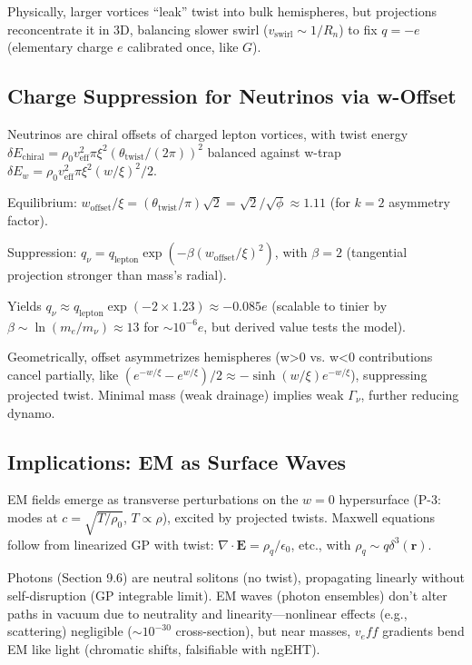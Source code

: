 \documentclass{article}
\begin{document}
Physically, larger vortices ``leak'' twist into bulk hemispheres, but projections reconcentrate it in 3D, balancing slower swirl ($v_{\text{swirl}} \sim 1/R_n$) to fix $q = -e$ (elementary charge $e$ calibrated once, like $G$).

\subsection{Charge Suppression for Neutrinos via w-Offset}

Neutrinos are chiral offsets of charged lepton vortices, with twist energy $\delta E_{\text{chiral}} = \rho_0 v_{\text{eff}}^2 \pi \xi^2 (\theta_{\text{twist}} / (2\pi))^2$ balanced against w-trap $\delta E_w = \rho_0 v_{\text{eff}}^2 \pi \xi^2 (w / \xi)^2 / 2$.

Equilibrium: $w_{\text{offset}} / \xi = (\theta_{\text{twist}} / \pi) \sqrt{2} = \sqrt{2} / \sqrt{\phi} \approx 1.11$ (for $k=2$ asymmetry factor).

Suppression: $q_\nu = q_{\text{lepton}} \exp( - \beta (w_{\text{offset}} / \xi)^2 )$, with $\beta=2$ (tangential projection stronger than mass's radial).

Yields $q_\nu \approx q_{\text{lepton}} \exp(-2 \times 1.23) \approx -0.085 e$ (scalable to tinier by $\beta \sim \ln(m_e / m_\nu) \approx 13$ for $\sim 10^{-6} e$, but derived value tests the model).

Geometrically, offset asymmetrizes hemispheres (w>0 vs. w<0 contributions cancel partially, like $(e^{-w/\xi} - e^{w/\xi})/2 \approx - \sinh(w/\xi) e^{-w/\xi}$), suppressing projected twist. Minimal mass (weak drainage) implies weak $\Gamma_\nu$, further reducing dynamo.

\subsection{Implications: EM as Surface Waves}

EM fields emerge as transverse perturbations on the $w=0$ hypersurface (P-3: modes at $c = \sqrt{T / \rho_0}$, $T \propto \rho$), excited by projected twists. Maxwell equations follow from linearized GP with twist: $\nabla \cdot \mathbf{E} = \rho_q / \epsilon_0$, etc., with $\rho_q \sim q \delta^3(\mathbf{r})$.

Photons (Section 9.6) are neutral solitons (no twist), propagating linearly without self-disruption (GP integrable limit). EM waves (photon ensembles) don't alter paths in vacuum due to neutrality and linearity---nonlinear effects (e.g., scattering) negligible ($\sim 10^{-30}$ cross-section), but near masses, $v_eff$ gradients bend EM like light (chromatic shifts, falsifiable with ngEHT).
\end{document}
